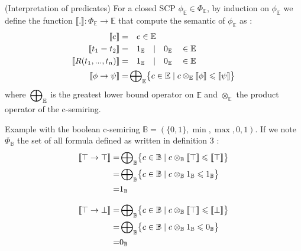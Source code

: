\documentclass[runningheads]{llncs}
\newcommand{\B}{\mathbb{B}}
\begin{document}
\begin{definition}{(Interpretation of predicates)} For a closed SCP $\phi_{\mathbb{E}} \in \Phi_\mathbb{E}$, by induction on $\phi_{\mathbb{E}}$ we define the function $\llbracket . \rrbracket : \Phi_\mathbb{E} \rightarrow \mathbb{E}$ that compute the semantic of $\phi_{\mathbb{E}}$ as : 
\begin{align*}
\llbracket e \rrbracket =  & \quad e \in \mathbb{E} \\
\llbracket t_1=t_2 \rrbracket =  & \quad 1_\mathbb{E} \quad |\quad 0_\mathbb{E} \quad \in \mathbb{E} \\
\llbracket R(t_1,...,t_n) \rrbracket =  & \quad 1_\mathbb{E} \quad |\quad 0_\mathbb{E} \quad \in \mathbb{E} \\
\llbracket \phi \rightarrow \psi \rrbracket =  & \sideset{}{_\mathbb{E}}\bigoplus \bigl\{ c \in \mathbb{E} \mid c \otimes_\mathbb{E} \llbracket \phi \rrbracket  \leqslant \llbracket  \psi \rrbracket  \bigr\} \\
\end{align*}
where $\sideset{}{_\mathbb{E}}\bigoplus$ is the greatest lower bound operator on $\mathbb{E}$ and $\otimes_\mathbb{E}$ the product operator of the c-semiring. 
\end{definition}

Example with the boolean c-semiring $\B = (\{0, 1\}, \min, \max, 0, 1)$. If we note $\Phi_\mathbb{B}$ the set of all formula defined as written in definition 3 :
\begin{align*}
\llbracket \top \rightarrow \top \rrbracket =  & \sideset{}{_\mathbb{B}}\bigoplus \bigl\{ c \in \mathbb{B} \mid c \otimes_\mathbb{B} \llbracket \top \rrbracket  \leqslant \llbracket  \top \rrbracket  \bigr\} \\
										    =  & \sideset{}{_\mathbb{B}}\bigoplus \bigl\{ c \in \mathbb{B} \mid c \otimes_\mathbb{B} 1_\mathbb{B}  \leqslant 1_\mathbb{B}  \bigr\} \\
										    =	& 1_\mathbb{B} 
\end{align*}

\begin{align*}
\llbracket \top \rightarrow \bot \rrbracket =  & \sideset{}{_\mathbb{B}}\bigoplus \bigl\{ c \in \mathbb{B} \mid c \otimes_\mathbb{B} \llbracket \top \rrbracket  \leqslant \llbracket  \bot \rrbracket  \bigr\} \\
										    =  & \sideset{}{_\mathbb{B}}\bigoplus \bigl\{ c \in \mathbb{B} \mid c \otimes_\mathbb{B} 1_\mathbb{B}  \leqslant 0_\mathbb{B}  \bigr\} \\
										    =	& 0_\mathbb{B} 
\end{align*}
\end{document}
